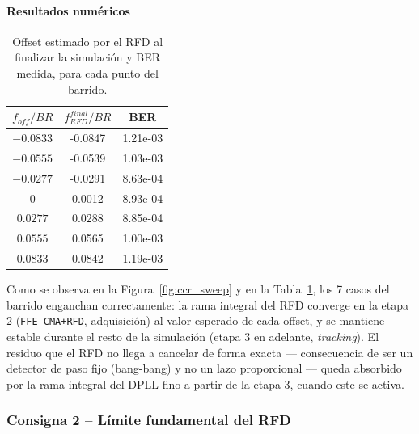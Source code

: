 \paragraph{Resultados numéricos}
\begin{table}[H]
    \centering
    \caption{Offset estimado por el RFD al finalizar la simulación y BER
    medida, para cada punto del barrido.}
    \label{tab:ccr_sweep}
    \begin{tabular}{ccc}
        \toprule
        $f_{off}/BR$ & $f_{RFD}^{final}/BR$ & BER \\
        \midrule
        $-0.0833$ & -0.0847 & 1.21e-03 \\
        $-0.0555$ & -0.0539 & 1.03e-03 \\
        $-0.0277$ & -0.0291 & 8.63e-04 \\
        $0$      & 0.0012 & 8.93e-04 \\
        $0.0277$  & 0.0288 & 8.85e-04 \\
        $0.0555$  & 0.0565 & 1.00e-03 \\
        $0.0833$  & 0.0842 & 1.19e-03 \\
        \bottomrule
    \end{tabular}
\end{table}
Como se observa en la Figura~\ref{fig:ccr_sweep} y en la
Tabla~\ref{tab:ccr_sweep}, los 7 casos del barrido enganchan
correctamente: la rama integral del RFD converge en la etapa 2
(\texttt{FFE-CMA+RFD}, adquisición) al valor esperado de cada offset, y se
mantiene estable durante el resto de la simulación (etapa 3 en adelante,
\emph{tracking}). El residuo que el RFD no llega a cancelar de forma exacta
--- consecuencia de ser un detector de paso fijo (bang-bang) y no un lazo
proporcional --- queda absorbido por la rama integral del DPLL fino a partir
de la etapa 3, cuando este se activa.
\subsubsection*{Consigna 2 -- Límite fundamental del RFD}
\label{sec:limite}
